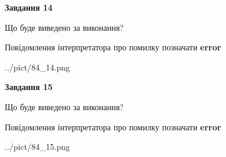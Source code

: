 \documentclass[11pt, ukrainian]{article}
\begin{document}
{\begin {large}
{\begin {center}\textbf{Завдання 14}\end {center}}\par
Що буде виведено за виконання? \par
Повідомлення інтерпретатора про помилку позначати \textbf{error}

\begin{center}
	{../pict/84_14.png}
\end{center}
\newpage

{\begin {center}\textbf{Завдання 15}\end {center}}\par
Що буде виведено за виконання? \par
Повідомлення інтерпретатора про помилку позначати \textbf{error}

\begin{center}
	{../pict/84_15.png}
\end{center}
\newpage

\end {large}}
\end{document}
